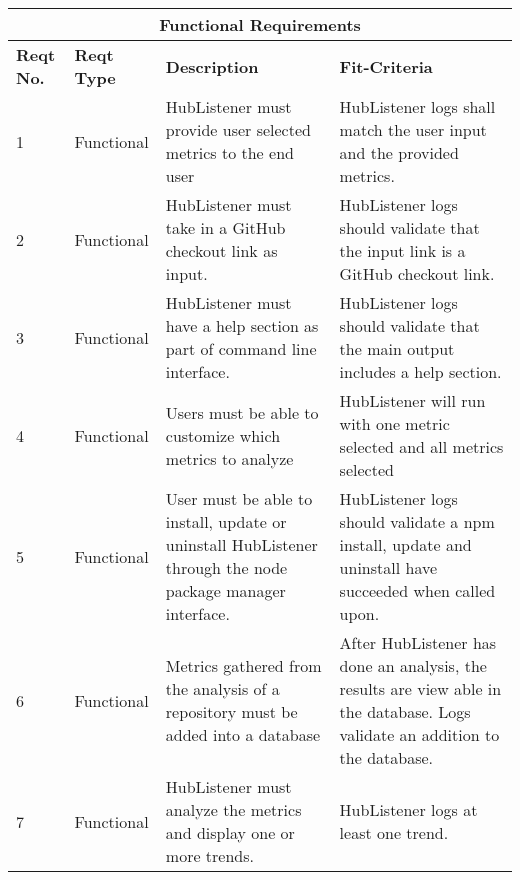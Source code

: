 \documentclass{article}
\begin{document}
\begin{tabular}{ |p{1cm}|p{2cm}|p{5cm}|p{3cm}|  }
\hline
\multicolumn{4}{|c|}{\textbf{Functional Requirements}} \\
\hline
\textbf{Reqt No.} & \textbf{Reqt Type} & \textbf{Description} & \textbf{Fit-Criteria}\\
\hline 
1 & Functional & HubListener must provide user selected metrics to the end user & HubListener logs shall match the user input and the provided metrics.\\
\hline 
2 & Functional & HubListener must take in a GitHub checkout link as input. & HubListener logs should validate that the input link is a GitHub checkout link.\\
\hline 
3 & Functional & HubListener must have a help section as part of command line interface. & HubListener logs should validate that the main output includes a help section.\\ 
\hline 
4 & Functional & Users must be able to customize which metrics to analyze & HubListener will run with one metric selected and all metrics selected\\
\hline 
5 & Functional & User must be able to install, update or uninstall HubListener through the node package manager interface. & HubListener logs should validate a npm install, update and uninstall have succeeded when called upon. \\
\hline 
6 & Functional & Metrics gathered from the analysis of a repository must be added into a database & After HubListener has done an analysis, the results are view able in the database. Logs validate an addition to the database.  \\
\hline 
7 & Functional & HubListener must analyze the metrics and display one or more trends. & HubListener logs at least one trend. \\
\hline
\end{tabular}
\end{document}
